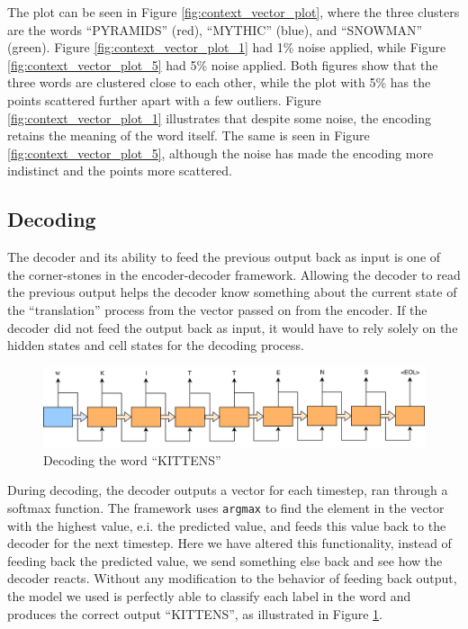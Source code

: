 The plot can be seen in Figure \ref{fig:context_vector_plot}, where the three clusters are the words ``PYRAMIDS'' (red), ``MYTHIC'' (blue), and ``SNOWMAN'' (green). Figure \ref{fig:context_vector_plot_1} had 1\% noise applied, while Figure \ref{fig:context_vector_plot_5} had 5\% noise applied. Both figures show that the three words are clustered close to each other, while the plot with 5\% has the points scattered further apart with a few outliers. Figure \ref{fig:context_vector_plot_1} illustrates that despite some noise, the encoding retains the meaning of the word itself. The same is seen in Figure \ref{fig:context_vector_plot_5}, although the noise has made the encoding more indistinct and the points more scattered.

\subsection{Decoding}
The decoder and its ability to feed the previous output back as input is one of the corner-stones in the encoder-decoder framework. Allowing the decoder to read the previous output helps the decoder know something about the current state of the ``translation'' process from the vector passed on from the encoder. If the decoder did not feed the output back as input, it would have to rely solely on the hidden states and cell states for the decoding process.

\begin{figure}[!ht]
    \centering
    \includegraphics[width=1\textwidth]{fig/results/kittens_correct.png}
    \caption{Decoding the word ``KITTENS''}
    \label{fig:kittens_correct}
\end{figure}

During decoding, the decoder outputs a vector for each timestep, ran through a softmax function. The framework uses {\tt argmax} to find the element in the vector with the highest value, e.i. the predicted value, and feeds this value back to the decoder for the next timestep. Here we have altered this functionality, instead of feeding back the predicted value, we send something else back and see how the decoder reacts. Without any modification to the behavior of feeding back output, the model we used is perfectly able to classify each label in the word and produces the correct output ``KITTENS'', as illustrated in Figure \ref{fig:kittens_correct}. 

